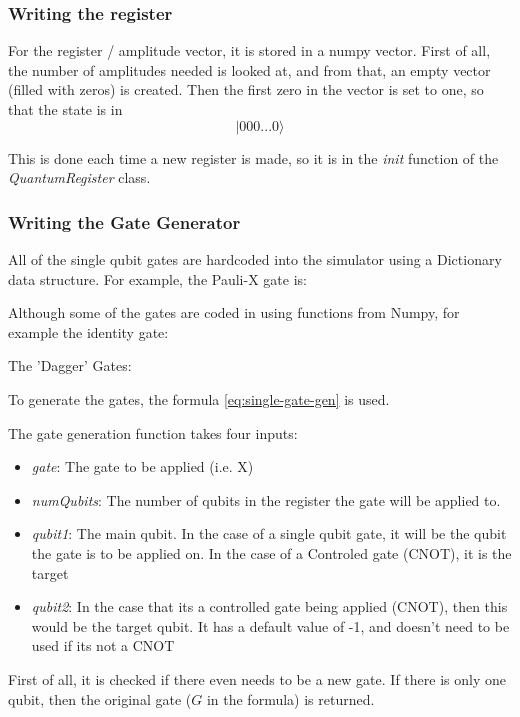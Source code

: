 \documentclass[../main.tex]{subfiles}
\begin{document}
\subsubsection{Writing the register}
For the register / amplitude vector, it is stored in a numpy vector.
First of all, the number of amplitudes needed is looked at, and from that, an empty vector (filled with zeros) is created. Then the first zero in the vector is set to one, so that the state is in 
$$
\lvert 000...0 \rangle
$$

This is done each time a new register is made, so it is in the \emph{init} function of the \emph{QuantumRegister} class.



\subsubsection{Writing the Gate Generator}
All of the single qubit gates are hardcoded into the simulator using a Dictionary data structure. For example, the Pauli-X gate is:

Although some of the gates are coded in using functions from Numpy, for example the identity gate:

The 'Dagger' Gates:


To generate the gates, the formula \ref{eq:single-gate-gen}
is used.

The gate generation function takes four inputs:
\begin{itemize}
	\item \emph{gate}: The gate to be applied (i.e. X)
	\item \emph{numQubits}: The number of qubits in the register the gate will be applied to.
	\item \emph{qubit1}: The main qubit. In the case of a single qubit gate, it will be the qubit the gate is to be applied on. In the case of a Controled gate (CNOT), it is the target
	\item \emph{qubit2}: In the case that its a controlled gate being applied (CNOT), then this would be the target qubit. It has a default value of -1, and doesn't need to be used if its not a CNOT
\end{itemize}

First of all, it is checked if there even needs to be a new gate. 
If there is only one qubit, then the original gate (\(G\) in the formula) is returned.
\end{document}
